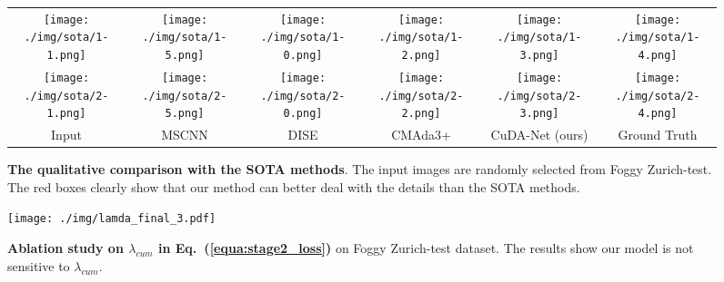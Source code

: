 \documentclass[10pt,twocolumn,letterpaper]{article}
\begin{document}
\begin{figure*}[t]
\centering
		\tabcolsep=0.5pt
		\renewcommand\arraystretch{0.5}
		\begin{tabular}{cccccc}
			\texttt{[image: ./img/sota/1-1.png]} &
			\texttt{[image: ./img/sota/1-5.png]} &
			\texttt{[image: ./img/sota/1-0.png]} &
			\texttt{[image: ./img/sota/1-2.png]} &
			\texttt{[image: ./img/sota/1-3.png]} &
			\texttt{[image: ./img/sota/1-4.png]} \\
			\texttt{[image: ./img/sota/2-1.png]} &
			\texttt{[image: ./img/sota/2-5.png]} &
			\texttt{[image: ./img/sota/2-0.png]} &
			\texttt{[image: ./img/sota/2-2.png]} &
			\texttt{[image: ./img/sota/2-3.png]} &
			\texttt{[image: ./img/sota/2-4.png]} \\
			Input  & MSCNN & DISE & CMAda3+ & CuDA-Net (ours) & Ground Truth   \\
	\end{tabular}
	\vspace{-2mm}
\caption{\label{fig:sota} \textbf{The qualitative comparison with the SOTA methods}. The input images are randomly selected from Foggy Zurich-test. The red boxes clearly show that our method can better deal with the details than the SOTA methods.} 
\vspace{-2mm}
\end{figure*}


\begin{figure}[!t]
\centering
\texttt{[image: ./img/lamda\_final\_3.pdf]}
\vspace{-4mm}
\caption{\textbf{Ablation study on $\lambda_{cum}$ in Eq.~(\ref{equa:stage2_loss})} on Foggy Zurich-test dataset. The results show our model is not sensitive to $\lambda_{cum}$.}
\vspace{-2mm}
\label{fig:lamda}
\end{figure}
\end{document}
